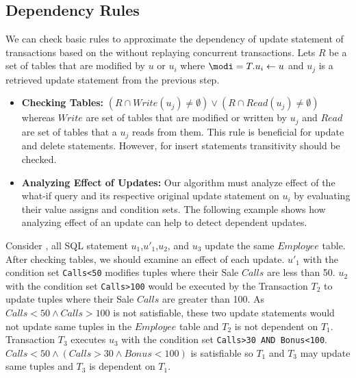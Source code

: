 \subsection{Dependency Rules}
\label{def:basic-rules}
We can check basic rules to approximate the dependency of update statement of transactions based on the  without replaying concurrent transactions. Lets $R$ be a set of tables that are modified by $u$ or $u_i$ where $\modi = T.u_i \gets u$ and $u_j$ is a retrieved update statement from the previous step.
%
%
\begin{itemize}
\item \textbf{Checking Tables:} $(R \cap Write(u_j)\neq \emptyset) \vee (R \cap Read(u_j)\neq \emptyset)$  whereas $Write$ are set of tables that are modified or written by $u_j$ and $Read$ are set of tables that a $u_j$ reads from them. This rule is beneficial for update and delete statements. However, for insert statements transitivity should be checked.
\item \textbf{Analyzing Effect of Updates:} Our algorithm must analyze effect of the what-if query and its respective original update statement on $u_i$
%
by evaluating their value assigns and condition sets. The following example shows how analyzing effect of an update can help to detect dependent updates.
%
\end{itemize}
\begin{exam}
\label{ex:algo-example}
Consider , all SQL statement $u_1$,$u'_1$,$u_2$, and $u_3$ update the same $Employee$ table. After checking tables, we should examine an effect of each update. $u'_1$ with the condition set \lstinline!Calls<50! modifies tuples where their Sale $Calls$ are less than 50. $u_2$ with the condition set \lstinline!Calls>100! would be executed by the Transaction $T_2$ to update tuples where their Sale $Calls$ are greater than 100. As $Calls<50 \wedge Calls>100$ is not satisfiable, these two update statements would not update same tuples in the $Employee$ table and $T_2$ is not dependent on $T_1$. Transaction $T_3$ executes $u_3$ with the condition set \lstinline!Calls>30 AND Bonus<100!. $Calls<50 \wedge (Calls>30 \wedge Bonus<100)$ is satisfiable so $T_1$ and $T_3$ may update same tuples and $T_3$ is dependent on $T_1$.
\end{exam}
